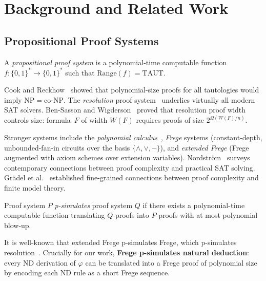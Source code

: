 \documentclass[acmtocl,review,anonymous]{acmart}
\begin{document}
\section{Background and Related Work}
\label{sec:background}

\subsection{Propositional Proof Systems}

\begin{definition}
A \emph{propositional proof system} is a polynomial-time computable
function $f : \{0,1\}^* \to \{0,1\}^*$ such that
$\mathrm{Range}(f) = \mathrm{TAUT}$.
\end{definition}

Cook and Reckhow~\cite{CookReckhow1979} showed that polynomial-size
proofs for all tautologies would imply
$\mathrm{NP} = \mathrm{co\text{-}NP}$.  The \emph{resolution} proof
system~\cite{Robinson1965} underlies virtually all modern SAT
solvers.  Ben-Sasson and
Wigderson~\cite{Ben-Sasson2001} proved that resolution proof width
controls size: formula~$F$ of width $W(F)$ requires proofs of size
$2^{\Omega(W(F)/n)}$.

Stronger systems include the \emph{polynomial
calculus}~\cite{Tzameret2011,AtseriasOchremiak2019}, \emph{Frege}
systems (constant-depth, unbounded-fan-in circuits over the basis
$\{\wedge, \vee, \neg\}$), and \emph{extended Frege} (Frege augmented
with axiom schemes over extension variables).
Nordstr\"{o}m~\cite{NordstromProofComplexity2025} surveys
contemporary connections between proof complexity and practical SAT
solving.  Gr\"{a}del et al.~\cite{GradelGrohe2019} established fine-grained
connections between proof complexity and finite model theory.

\begin{definition}[p-simulation]
Proof system $P$ \emph{p-simulates} proof system $Q$ if there exists
a polynomial-time computable function translating $Q$-proofs into
$P$-proofs with at most polynomial blow-up.
\end{definition}

It is well-known that extended Frege p-simulates Frege, which
p-simulates resolution~\cite{Beame1998}.  Crucially for our work,
\textbf{Frege p-simulates natural deduction}: every ND derivation of
$\varphi$ can be translated into a Frege proof of polynomial size by
encoding each ND rule as a short Frege sequence.
\end{document}
